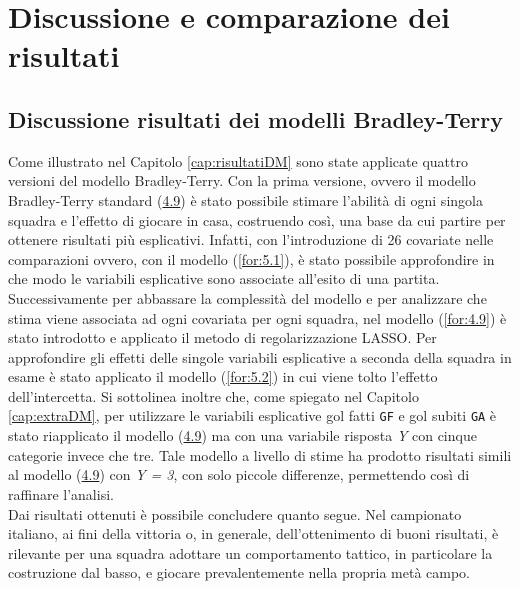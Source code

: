 \chapter{Discussione e comparazione dei risultati}
\label{cap:precls}
\section{Discussione risultati dei modelli Bradley-Terry}
Come illustrato nel Capitolo \ref{cap:risultatiDM} sono state applicate quattro versioni del modello Bradley-Terry. Con la prima versione, ovvero il modello Bradley-Terry standard (\hyperref[for:3.9]{4.9}) \autocite{bradley1952rank} è stato possibile stimare l'abilità di ogni singola squadra e l'effetto di giocare in casa, costruendo così, una base da cui partire per ottenere risultati più esplicativi. Infatti, con l'introduzione di 26 covariate nelle comparazioni ovvero, con il modello (\ref{for:5.1}), è stato possibile approfondire in che modo le variabili esplicative sono associate all'esito di una partita. Successivamente per abbassare la complessità del modello e per analizzare che stima viene associata ad ogni covariata per ogni squadra, nel modello (\ref{for:4.9}) è stato introdotto e applicato il metodo di regolarizzazione LASSO. Per approfondire gli effetti delle singole variabili esplicative a seconda della squadra in esame è stato applicato il modello (\ref{for:5.2}) in cui viene tolto l'effetto dell'intercetta. Si sottolinea inoltre che, come spiegato nel Capitolo \ref{cap:extraDM}, per utilizzare le variabili esplicative gol fatti \texttt{GF} e gol subiti \texttt{GA} è stato riapplicato il modello (\hyperref[for:3.9]{4.9}) ma con una variabile risposta \emph{Y} con cinque categorie invece che tre. Tale modello a livello di stime ha prodotto risultati simili al modello (\hyperref[for:3.9]{4.9}) con \emph{Y = 3}, con solo piccole differenze, permettendo così di raffinare l'analisi.\\
Dai risultati ottenuti è possibile concludere quanto segue. Nel campionato italiano, ai fini della vittoria o, in generale, dell'ottenimento di buoni risultati, è rilevante per una squadra adottare un comportamento tattico, in particolare la costruzione dal basso, e giocare prevalentemente nella propria metà campo. 
